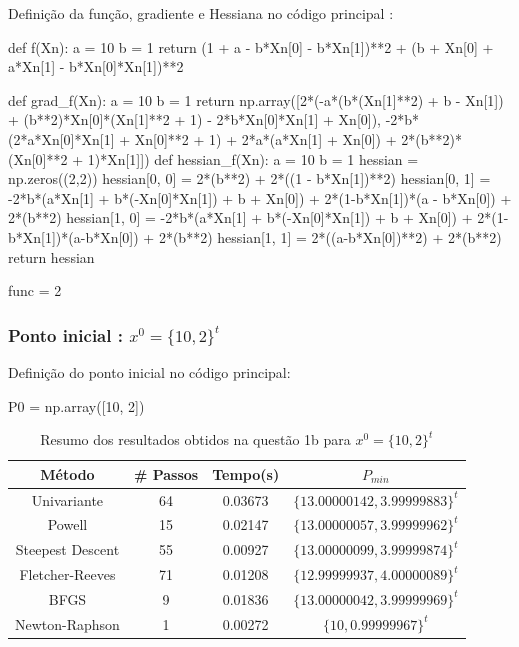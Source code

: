 \documentclass[10pt, a4paper]{article}
\begin{document}
\vspace{5mm}

Definição da função, gradiente e Hessiana no código principal :

\begin{python}
  def f(Xn):
    a = 10
    b = 1
    return (1 + a - b*Xn[0] - b*Xn[1])**2 + (b + Xn[0] + a*Xn[1] - b*Xn[0]*Xn[1])**2 
    
  def grad_f(Xn):
      a = 10
      b = 1
      return np.array([2*(-a*(b*(Xn[1]**2) + b - Xn[1]) + (b**2)*Xn[0]*(Xn[1]**2 + 1) - 2*b*Xn[0]*Xn[1] + Xn[0]),
                      -2*b*(2*a*Xn[0]*Xn[1] + Xn[0]**2 + 1) + 2*a*(a*Xn[1] + Xn[0]) + 2*(b**2)*(Xn[0]**2 + 1)*Xn[1]])
  def hessian_f(Xn):
      a = 10
      b = 1
      hessian = np.zeros((2,2))
      hessian[0, 0] = 2*(b**2) + 2*((1 - b*Xn[1])**2)
      hessian[0, 1] = -2*b*(a*Xn[1] + b*(-Xn[0]*Xn[1]) + b + Xn[0]) + 2*(1-b*Xn[1])*(a - b*Xn[0]) + 2*(b**2)
      hessian[1, 0] = -2*b*(a*Xn[1] + b*(-Xn[0]*Xn[1]) + b + Xn[0]) + 2*(1-b*Xn[1])*(a-b*Xn[0]) + 2*(b**2)
      hessian[1, 1] = 2*((a-b*Xn[0])**2) + 2*(b**2)
      return hessian
      
  func = 2
\end{python}

\subsubsection{Ponto inicial : $x^0 = \{10,2\}^t $}

Definição do ponto inicial no código principal:
\begin{python}
  P0 = np.array([10, 2])
\end{python}

\begin{table}[H]
  \begin{center}
    \begin{tabular}{c|c|c|c}
      \textbf{Método} & \textbf{\# Passos} & \textbf{Tempo(s)} & \textbf{$P_{min}$}\\
      \hline
      Univariante & 64 & 0.03673 & $\{13.00000142, 3.99999883\}^t$\\
      Powell & 15 & 0.02147 & $\{13.00000057, 3.99999962\}^t$\\
      Steepest Descent & 55 & 0.00927 & $\{13.00000099, 3.99999874\}^t$\\
      Fletcher-Reeves & 71 & 0.01208 & $\{12.99999937, 4.00000089\}^t$\\
      BFGS & 9 & 0.01836 & $\{13.00000042, 3.99999969\}^t$\\
      Newton-Raphson & 1 & 0.00272 & $\{10, 0.99999967\}^t$\\
    \end{tabular}
  \end{center}
  \caption{Resumo dos resultados obtidos na questão 1b para $x^0 = \{10,2\}^t$}
\end{table}
\end{document}
